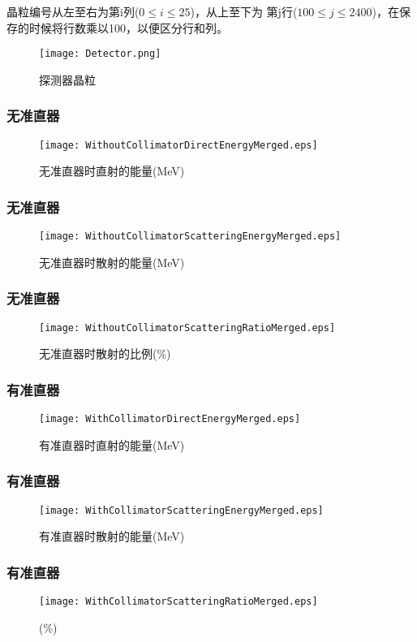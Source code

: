 \documentclass{beamer}
\begin{document}
\begin{CJK*}{UTF8}{gkai}
\begin{frame}
\begin{minipage}[t]{0.3\textwidth}
      晶粒编号从左至右为第i列($0\leq i \leq 25$)，从上至下为
      第j行($100\le j \le2400$)，在保存的时候将行数乘以100，以便区分行和列。
    \end{minipage}
    \begin{minipage}[t]{0.7\textwidth}
      \begin{figure}[ht]
	\centering
        \texttt{[image: Detector.png]}
	\caption{\liuhao 探测器晶粒}
	\label{Detector}
      \end{figure}
    \end{minipage}
  \end{frame}
  \begin{frame}\frametitle{无准直器}
    \begin{figure}[ht]
      \centering
      \texttt{[image: WithoutCollimatorDirectEnergyMerged.eps]}
      \caption{\liuhao 无准直器时直射的能量(MeV)}
    \end{figure}
  \end{frame}
  \begin{frame}\frametitle{无准直器}
    \begin{figure}[ht]
      \centering
      \texttt{[image: WithoutCollimatorScatteringEnergyMerged.eps]}
      \caption{\liuhao 无准直器时散射的能量(MeV)}
    \end{figure}
  \end{frame}
  \begin{frame}\frametitle{无准直器}
    \begin{figure}[ht]
      \centering
      \texttt{[image: WithoutCollimatorScatteringRatioMerged.eps]}
      \caption{\liuhao 无准直器时散射的比例(\%)}
    \end{figure}
  \end{frame}
  \begin{frame}\frametitle{有准直器}
    \begin{figure}[ht]
      \centering
      \texttt{[image: WithCollimatorDirectEnergyMerged.eps]}
      \caption{\liuhao 有准直器时直射的能量(MeV)}
    \end{figure}
  \end{frame}
  \begin{frame}\frametitle{有准直器}
    \begin{figure}[ht]
      \centering
      \texttt{[image: WithCollimatorScatteringEnergyMerged.eps]}
      \caption{\liuhao 有准直器时散射的能量(MeV)}
    \end{figure}
  \end{frame}
  \begin{frame}\frametitle{有准直器}
    \begin{figure}[ht]
      \centering
      \texttt{[image: WithCollimatorScatteringRatioMerged.eps]}
      \caption{(\%)}
    \end{figure}
  \end{frame}

\end{CJK*}
\end{document}
